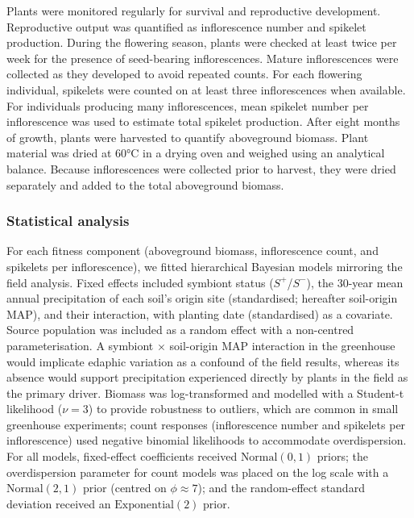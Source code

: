 \documentclass[12pt]{article}\usepackage[]{graphicx}\usepackage[dvipsnames]{xcolor}
\begin{document}
{Plants were monitored regularly for survival and reproductive development. 
Reproductive output was quantified as inflorescence number and spikelet production. 
During the flowering season, plants were checked at least twice per week for the presence of seed-bearing inflorescences. 
Mature inflorescences were collected as they developed to avoid repeated counts. 
For each flowering individual, spikelets were counted on at least three inflorescences when available.
For individuals producing many inflorescences, mean spikelet number per inflorescence was used to estimate total spikelet production.
After eight months of growth, plants were harvested to quantify aboveground biomass. 
Plant material was dried at 60°C in a drying oven and weighed using an analytical balance. 
Because inflorescences were collected prior to harvest, they were dried separately and added to the total aboveground biomass.

\subsubsection*{Statistical analysis}
\label{sec:greenhouse_models}
For each fitness component (aboveground biomass, inflorescence count, and spikelets per inflorescence), we fitted hierarchical Bayesian models mirroring the field analysis. Fixed effects included symbiont status 
($S^{+}$/$S^{-}$), the 30-year mean annual precipitation of each soil's origin site (standardised; hereafter soil-origin MAP), and their interaction, with planting date (standardised) as a covariate. 
Source population was included as a random effect with a non-centred parameterisation. 
A symbiont $\times$ soil-origin MAP interaction in the greenhouse would implicate edaphic variation as a confound of the field results, whereas its absence would support precipitation experienced directly 
by plants in the field as the primary driver.
Biomass was log-transformed and modelled with a Student-t likelihood ($\nu = 3$) to provide robustness to outliers, which are common in small greenhouse experiments; count responses (inflorescence number and spikelets 
per inflorescence) used negative binomial likelihoods to accommodate overdispersion. 
For all models, fixed-effect coefficients received $\text{Normal}(0, 1)$ priors; the overdispersion parameter for count models was placed on the log scale with a $\text{Normal}(2, 1)$ prior (centred on 
$\phi \approx 7$); and the random-effect standard deviation received an $\text{Exponential}(2)$ prior.

}
\end{document}
